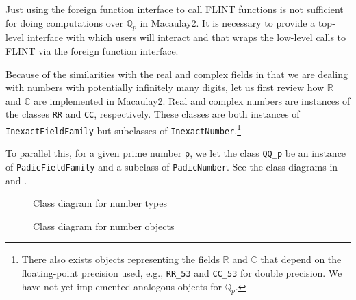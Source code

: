 \documentclass[runningheads]{llncs}
\newcommand{\CC}{\mathbb C}
\newcommand{\QQ}{\mathbb Q}
\newcommand{\RR}{\mathbb R}
\begin{document}
Just using the foreign function interface to call FLINT functions is not sufficient for doing computations over $\QQ_p$ in Macaulay2.  It is necessary to provide a top-level interface with which users will interact and that wraps the low-level calls to FLINT via the foreign function interface.

Because of the similarities with the real and complex fields in that we are dealing with numbers with potentially infinitely many digits, let us first review how $\RR$ and $\CC$ are implemented in Macaulay2.  Real and complex numbers are instances of the classes \texttt{RR} and \texttt{CC}, respectively.  These classes are both instances of \texttt{InexactFieldFamily} but subclasses of \texttt{InexactNumber}.\footnote{There also exists objects representing the fields $\RR$ and $\CC$ that depend on the floating-point precision used, e.g., \texttt{RR\_53} and \texttt{CC\_53} for double precision.  We have not yet implemented analogous objects for $\QQ_p$.}

To parallel this, for a given prime number \texttt{p}, we let the class \texttt{QQ\_p} be an instance of \texttt{PadicFieldFamily} and a subclass of \texttt{PadicNumber}.  See the class diagrams in  and .

\begin{figure}[htbp!]
  \centering
  \caption{Class diagram for number types}
  \label{type class diagram}
\end{figure}


\begin{figure}[htbp!]
  \centering
  \caption{Class diagram for number objects}
  \label{object class diagram}
\end{figure}
\end{document}
